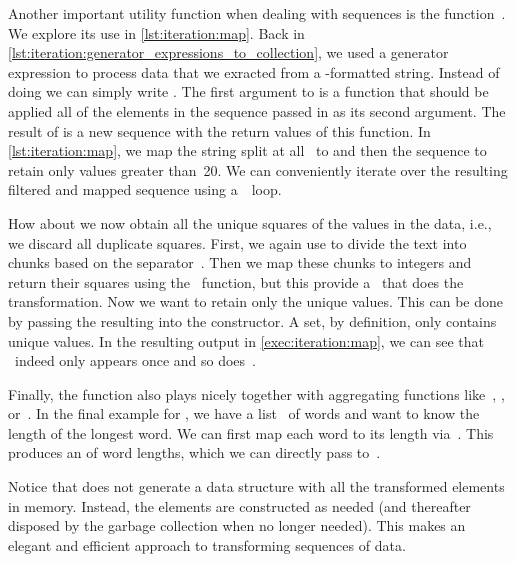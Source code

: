 %
%
%
Another important utility function when dealing with sequences is the function~.
We explore its use in \cref{lst:iteration:map}.
Back in \cref{lst:iteration:generator_expressions_to_collection}, we used a generator expression to process data that we exracted from a -formatted string.
Instead of doing  we can simply write .
The first argument to  is a function that should be applied all of the elements in the sequence passed in as its second argument.
The result of  is a new sequence with the return values of this function.
In \cref{lst:iteration:map}, we map the string  split at all~\pythonil{\",\"} to  and then  the sequence to retain only values greater than~20.
We can conveniently iterate over the resulting filtered and mapped sequence using a~~loop.

How about we now obtain all the unique squares of the values in the  data, i.e., we discard all duplicate squares.
First, we again use  to divide the text into chunks based on the separator~\pythonil{\",\"}.
Then we map these chunks to integers and return their squares using the ~function, but this provide a~ that does the transformation.
Now we want to retain only the unique values.
This can be done by passing the resulting  into the  constructor.
A set, by definition, only contains unique values.
In the resulting output in \cref{exec:iteration:map}, we can see that ~indeed only appears once and so does~.

Finally, the  function also plays nicely together with aggregating functions like~, , or~.
In the final example for , we have a list~ of words and want to know the length of the longest word.
We can first map each word to its length via~.
This produces an  of word lengths, which we can directly pass to~.

Notice that  does not generate a data structure with all the transformed elements in memory.
Instead, the elements are constructed as needed (and thereafter disposed by the garbage collection when no longer needed).
This makes  an elegant and efficient approach to transforming sequences of data.

